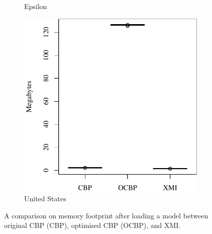\documentclass{llncs}
\begin{document}
\begin{figure}[ht]
\begin{subfigure}{0.325\textwidth}
           \caption{Epsilon}
           \label{fig:load_memory_epsilon}
       \end{subfigure}
       \hfill
       \begin{subfigure}{0.325\textwidth}
           \centering
           \includegraphics[width=\linewidth]{images/load_memory_wikipedia}
           \caption{United States}
           \label{fig:load_memory_wikipedia}
       \end{subfigure}
       \caption{A comparison on memory footprint after loading a model between original CBP (CBP), optimised CBP (OCBP), and XMI.}
       \label{fig:loadmemory}
   \end{figure}
    
\end{document}
